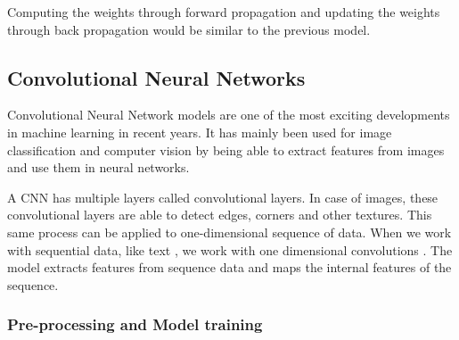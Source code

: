 Computing the weights through forward propagation and updating the weights through back propagation would be similar to the previous model.

\subsection{Convolutional Neural Networks}

Convolutional Neural Network models \cite{krizhevsky2012imagenet} are one of the most exciting developments in machine learning in recent years. It has mainly been used for image classification \cite{lawrence1997face} and computer vision \cite{karpathy2014large} by being able to extract features from images and use them in neural networks.

A CNN has multiple layers called convolutional layers. In case of images, these convolutional layers are able to detect edges, corners and other textures. This same process can be applied to one-dimensional sequence of data. When we work with sequential data, like text \cite{kim2014convolutional} \cite{kalchbrenner2014convolutional}, we work with one dimensional convolutions \cite{hughes2017medical}. The model extracts features from sequence data and maps the internal features of the sequence.

\subsubsection{Pre-processing and Model training}

